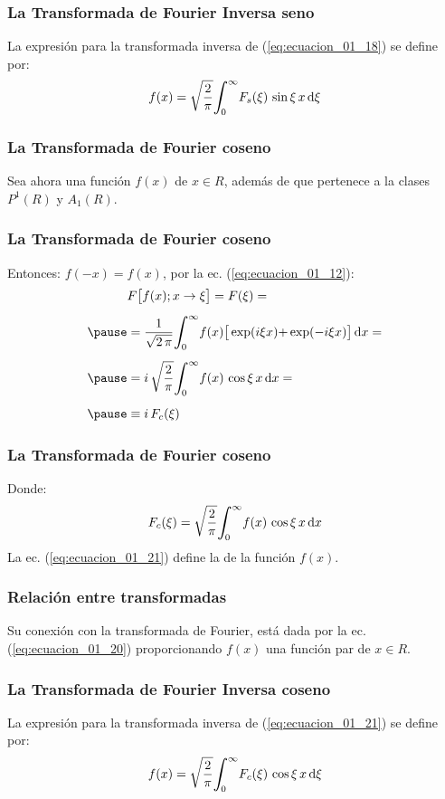 \begin{frame}
\frametitle{La Transformada de Fourier Inversa seno}
La expresión para la transformada inversa de (\ref{eq:ecuacion_01_18}) se define por:
\pause
\begin{align}
f (x) = \sqrt{\dfrac{2}{\pi}} \scaleint{6ex}_{\bs 0}^{\infty} F_{s}(\xi) \, \sin \xi \, x \dd{\xi}
\label{eq:ecuacion_01_19}
\end{align}
\end{frame}
\begin{frame}
\frametitle{La Transformada de Fourier coseno}
Sea ahora una función  $f (x)$ de $x \in R$, \pause además de que pertenece a la clases $P^{1}(R)$ y $A_{1}(R)$.
\end{frame}
\begin{frame}
\frametitle{La Transformada de Fourier coseno}
Entonces: $f (-x) = f (x)$, por la ec. (\ref{eq:ecuacion_01_12}):
\pause
\begin{eqnarray}
\begin{aligned}[b]
&F \big[ f (x); x \to \xi \big] = F (\xi) = \\[0.5em] \pause
&= \dfrac{1}{\sqrt{2 \, \pi}} \scaleint{6ex}_{\bs 0}^{\infty} f (x) \big[ \exp(i \xi x) {+} \exp(-i \xi x) \big] \dd{x} = \\[0.5em] \pause
&= i \, \sqrt{\dfrac{2}{\pi}} \scaleint{6ex}_{\bs 0}^{\infty} f (x) \, \cos \xi \, x \dd{x} = \\[0.5em] \pause
&\equiv i \, F_{c} (\xi)    
\end{aligned}
\label{eq:ecuacion_01_20}
\end{eqnarray}
\end{frame}
\begin{frame}
\frametitle{La Transformada de Fourier coseno}
Donde:
\pause
\begin{align}
F_{c} (\xi) = \sqrt{\dfrac{2}{\pi}} \scaleint{6ex}_{\bs 0}^{\infty} f (x) \, \cos \xi \, x \dd{x}
\label{eq:ecuacion_01_21}
\end{align}
La ec. (\ref{eq:ecuacion_01_21}) define la  de la función $f (x)$.
\end{frame}
\begin{frame}
\frametitle{Relación entre transformadas}
Su conexión con la transformada de Fourier, está dada por la ec. (\ref{eq:ecuacion_01_20}) proporcionando $f (x)$ una función par de $x \in R$.
\end{frame}
\begin{frame}
\frametitle{La Transformada de Fourier Inversa coseno}
La expresión para la transformada inversa de (\ref{eq:ecuacion_01_21}) se define por:
\pause
\begin{align}
f (x) = \sqrt{\dfrac{2}{\pi}} \scaleint{6ex}_{\bs 0}^{\infty} F_{c}(\xi) \, \cos \xi \, x \dd{\xi}
\label{eq:ecuacion_01_22}
\end{align}
\end{frame}

